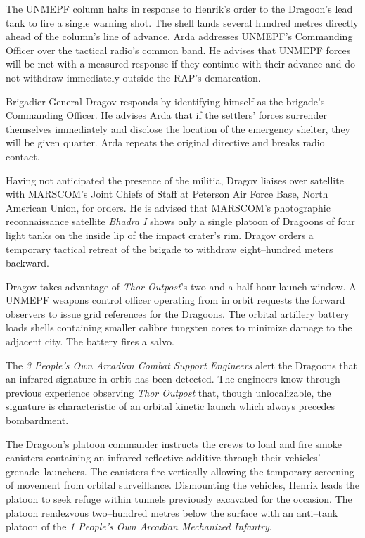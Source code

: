 The UNMEPF column halts in response to Henrik's order to the Dragoon's lead tank to fire a single warning shot. The shell lands several hundred metres directly ahead of the column's line of advance. Arda addresses UNMEPF's Commanding Officer over the tactical radio's common band. He advises that UNMEPF forces will be met with a measured response if they continue with their advance and do not withdraw immediately outside the RAP's demarcation. 

Brigadier General Dragov responds by identifying himself as the brigade's Commanding Officer. He advises Arda that if the settlers' forces surrender themselves immediately and disclose the location of the emergency shelter, they will be given quarter. Arda repeats the original directive and breaks radio contact.

Having not anticipated the presence of the militia, Dragov liaises over satellite with MARSCOM's Joint Chiefs of Staff at Peterson Air Force Base, North American Union, for orders. He is advised that MARSCOM's photographic reconnaissance satellite {\it Bhadra I} shows only a single platoon of Dragoons of four light tanks on the inside lip of the impact crater's rim. Dragov orders a temporary tactical retreat of the brigade to withdraw eight--hundred meters backward.
\StopTimelineDate

Dragov takes advantage of {\it Thor Outpost}'s two and a half hour launch window. A UNMEPF weapons control officer operating from in orbit requests the forward observers to issue grid references for the Dragoons. The orbital artillery battery loads shells containing smaller calibre tungsten cores to minimize damage to the adjacent city. The battery fires a salvo.

The {\it 3 People's Own Arcadian Combat Support Engineers} alert the Dragoons that an infrared signature in orbit has been detected. The engineers know through previous experience observing {\it Thor Outpost} that, though unlocalizable, the signature is characteristic of an orbital kinetic launch which always precedes bombardment. 

The Dragoon's platoon commander instructs the crews to load and fire smoke canisters containing an infrared reflective additive through their vehicles' grenade--launchers. The canisters fire vertically allowing the temporary screening of movement from orbital surveillance. Dismounting the vehicles, Henrik leads the platoon to seek refuge within tunnels previously excavated for the occasion. The platoon rendezvous two--hundred metres below the surface with an anti--tank platoon of the {\it 1 People's Own Arcadian Mechanized Infantry}.

